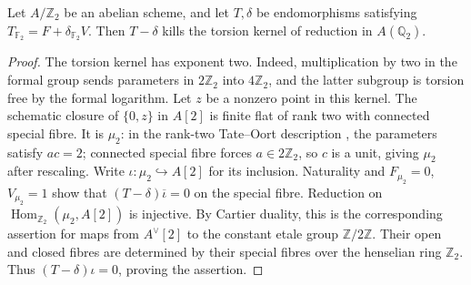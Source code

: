 \begin{lemma}\label{lem:decic49-dyadic-kernel}
Let $A/\mathbb Z_2$ be an abelian scheme, and let $T,\delta$ be
endomorphisms satisfying $T_{\mathbb F_2}=F+\delta_{\mathbb F_2}V$.
Then $T-\delta$ kills the torsion kernel of reduction in $A(\mathbb Q_2)$.
\end{lemma}
\begin{proof}
The torsion kernel has exponent two. Indeed, multiplication by two
in the formal group sends parameters in $2\mathbb Z_2$ into
$4\mathbb Z_2$, and the latter subgroup is torsion free by the
formal logarithm.
Let $z$ be a nonzero point in this kernel. The schematic closure
of $\{0,z\}$ in $A[2]$ is finite flat of rank two with connected
special fibre. It is $\mu_2$: in the rank-two Tate--Oort description
\cite{TO}, the parameters satisfy $ac=2$; connected special fibre
forces $a\in2\mathbb Z_2$, so $c$ is a unit, giving $\mu_2$ after
rescaling. Write $\iota:\mu_2\hookrightarrow A[2]$ for its inclusion.
Naturality and $F_{\mu_2}=0$, $V_{\mu_2}=1$ show that
$(T-\delta)\overline\iota=0$ on the special fibre.
Reduction on $\operatorname{Hom}_{\mathbb Z_2}(\mu_2,A[2])$ is injective.
By Cartier duality, this is the corresponding assertion for maps
from $A^\vee[2]$ to the constant etale group $\mathbb Z/2\mathbb Z$.
Their open and closed fibres are determined by their special
fibres over the henselian ring $\mathbb Z_2$.
Thus $(T-\delta)\iota=0$, proving the assertion.
\end{proof}

